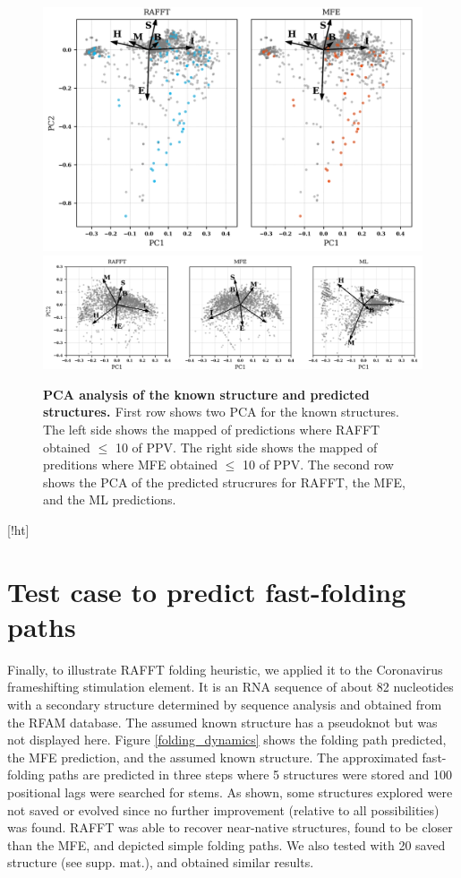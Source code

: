 \documentclass[a4paper,12pt]{article}
\begin{document}
{{\begin{figure}[!ht]
  \centering
  \includegraphics[scale=0.5]{img/pca_known.png}\\
  \includegraphics[scale=0.7]{img/pca_predicted.png} 
  \caption{\textbf{PCA analysis of the known structure and predicted structures. \label{pca_struct}}
    First row shows two PCA for the known structures.
    The left side shows the mapped of predictions where RAFFT obtained $\leq$ 10 of PPV.
    The right side shows the mapped of preditions where MFE obtained $\leq$ 10 of PPV.
    The second row shows the PCA of the predicted strucrures for RAFFT, the MFE, and the ML predictions.}
\end{figure}[!ht]

\clearpage
\section{Test case to predict fast-folding paths}
\label{sec:org8f2ad47}
Finally, to illustrate RAFFT folding heuristic, we applied it to the Coronavirus
frameshifting stimulation element. It is an RNA sequence of about 82 nucleotides
with a secondary structure determined by sequence analysis and obtained from the
RFAM database. The assumed known structure has a pseudoknot but was not
displayed here. Figure \ref{folding_dynamics} shows the folding path predicted,
the MFE prediction, and the assumed known structure. The approximated
fast-folding paths are predicted in three steps where 5 structures were stored
and 100 positional lags were searched for stems. As shown, some structures
explored were not saved or evolved since no further improvement (relative to all
possibilities) was found. RAFFT was able to recover near-native structures,
found to be closer than the MFE, and depicted simple folding paths. We also
tested with 20 saved structure (see supp. mat.), and obtained similar results.

}}
\end{document}
